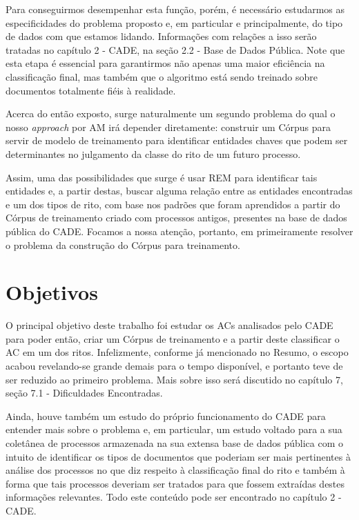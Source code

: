 \documentclass[11pt]{report}
\begin{document}
Para conseguirmos desempenhar esta função, porém, é necessário estudarmos as especificidades do problema proposto e, em particular e principalmente,
do tipo de dados com que estamos lidando. Informações com relações a isso serão tratadas no capítulo 2 - CADE, na seção 2.2 - Base de Dados Pública.
Note que esta etapa é essencial para garantirmos não apenas uma maior eficiência na classificação final, mas também que o algoritmo está sendo treinado sobre
documentos totalmente fiéis à realidade.

Acerca do então exposto, surge naturalmente um segundo problema do qual o nosso \textit{approach} por AM irá depender diretamente: construir um Córpus para servir de modelo de
treinamento para identificar entidades chaves que podem ser determinantes no julgamento da classe do rito de um futuro processo.

Assim, uma das possibilidades que surge é usar REM para identificar tais entidades e, a partir destas, buscar alguma relação entre as entidades encontradas e um dos tipos de rito, com
base nos padrões que foram aprendidos a partir do Córpus de treinamento criado com processos antigos, presentes na base de dados pública do CADE. Focamos
a nossa atenção, portanto, em primeiramente resolver o problema da construção do Córpus para treinamento.

\section{Objetivos}

\indent\indent O principal objetivo deste trabalho foi estudar os ACs analisados pelo CADE para poder então, criar um Córpus de treinamento e a partir deste classificar
o AC em um dos ritos. Infelizmente, conforme já mencionado no Resumo, o escopo acabou revelando-se grande demais para o tempo disponível, e portanto teve de ser reduzido
ao primeiro problema. Mais sobre isso será discutido no capítulo 7, seção 7.1 - Dificuldades Encontradas.

Ainda, houve também um estudo do próprio funcionamento do CADE para entender mais sobre o problema e, em particular, um estudo voltado para a sua coletânea de processos
armazenada na sua extensa base de dados pública com o intuito de identificar os tipos de documentos que poderiam ser mais pertinentes à análise dos processos no que diz respeito
à classificação final do rito e também à forma que tais processos deveriam ser tratados para que fossem extraídas destes informações relevantes. Todo este conteúdo pode ser encontrado no
capítulo 2 - CADE.
\end{document}
